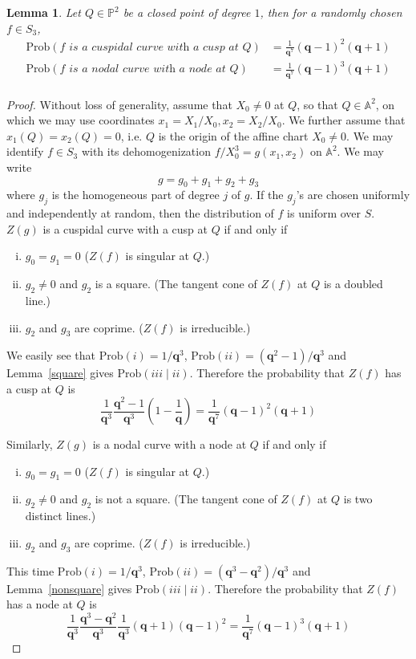 \documentclass[12pt]{article}
\theoremstyle{plain}
\newtheorem{lemma}[equation]{Lemma}
\theoremstyle{definition}
\newcommand{\IA}{\mathbb{A}}
\newcommand{\IP}{\mathbb{P}}
\newcommand{\<}{\langle}
\renewcommand{\>}{\rangle}
\newcommand{\Prob}{\mathrm{Prob}}
\begin{document}
\begin{lemma}
\label{mainlemma}
Let $Q \in \IP^2$ be a closed point of degree $1$, then for a randomly chosen $f \in S_3$,
\begin{align*}
\Prob(f \textit{ is a cuspidal curve with a cusp at } Q) &= \frac{1}{\pmb{q}^7}(\pmb{q} - 1)^2(\pmb{q} + 1) \\
\Prob(f \textit{ is a nodal curve with a node at } Q) &= \frac{1}{\pmb{q}^7}(\pmb{q} - 1)^3(\pmb{q} + 1) \\
\end{align*} 
\end{lemma}
\begin{proof}
Without loss of generality, assume that $X_0 \neq 0$ at $Q$, so that $Q \in \IA^2$, on which we may use coordinates $x_1 = X_1/X_0, x_2 = X_2/X_0$. We further assume that $x_1(Q) = x_2(Q) = 0$, i.e. $Q$ is the origin of the affine chart $X_0 \neq 0$. We may identify $f \in S_3$ with its dehomogenization $f/X_0^3 = g(x_1, x_2)$ on $\IA^2$. We may write 
$$ g = g_0 + g_1 + g_2 + g_3 $$
where $g_j$ is the homogeneous part of degree $j$ of $g$. If the $g_j$'s are chosen uniformly and independently at random, then the distribution of $f$ is uniform over $S$. $Z(g)$ is a cuspidal curve with a cusp at $Q$ if and only if 
\begin{enumerate}[i.]
\item $g_0 = g_1 = 0$ ($Z(f)$ is singular at $Q$.) 
\item $g_2 \neq 0$ and $g_2$ is a square. (The tangent cone of $Z(f)$ at $Q$ is a doubled line.)
\item $g_2$ and $g_3$ are coprime. ($Z(f)$ is irreducible.)
\end{enumerate} We easily see that $\Prob(i) = 1/\pmb{q}^3$, $\Prob(ii) = (\pmb{q}^2 - 1)/\pmb{q}^3$ and Lemma~\ref{square} gives $\Prob(iii \mid ii)$. Therefore the probability that $Z(f)$ has a cusp at $Q$ is 
$$ \frac{1}{\pmb{q}^3} \frac{\pmb{q}^2 - 1}{\pmb{q}^3} (1 - \frac{1}{\pmb{q}}) = \frac{1}{\pmb{q}^7}(\pmb{q} - 1)^2(\pmb{q} + 1) $$

Similarly, $Z(g)$ is a nodal curve with a node at $Q$ if and only if 
\begin{enumerate}[i.]
\item $g_0 = g_1 = 0$ ($Z(f)$ is singular at $Q$.) 
\item $g_2 \neq 0$ and $g_2$ is not a square. (The tangent cone of $Z(f)$ at $Q$ is two distinct lines.)
\item $g_2$ and $g_3$ are coprime. ($Z(f)$ is irreducible.)
\end{enumerate}
This time $\Prob(i) = 1/\pmb{q}^3$, $\Prob(ii) = (\pmb{q}^3 - \pmb{q}^2)/\pmb{q}^3$ and Lemma~\ref{nonsquare} gives $\Prob(iii \mid ii)$. Therefore the probability that $Z(f)$ has a node at $Q$ is 
$$ \frac{1}{\pmb{q}^3} \frac{\pmb{q}^3 - \pmb{q}^2}{\pmb{q}^3} \frac{1}{\pmb{q}^3}(\pmb{q} + 1)(\pmb{q} - 1)^2 = \frac{1}{\pmb{q}^7}(\pmb{q} - 1)^3(\pmb{q} + 1) $$
\end{proof}
\end{document}
